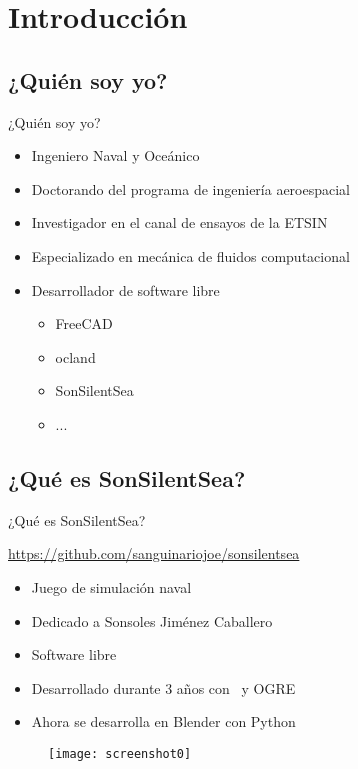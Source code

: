 \section{Introducción} 

\subsection{¿Quién soy yo?}
\begin{frame}{¿Quién soy yo?}
	\begin{itemize}
		\item Ingeniero Naval y Oceánico
		\item Doctorando del programa de ingeniería aeroespacial
		\item Investigador en el canal de ensayos de la ETSIN
		\item Especializado en mecánica de fluidos computacional
		\item Desarrollador de software libre
		\begin{itemize}
			\item FreeCAD
			\item ocland
			\item SonSilentSea
			\item ...
		\end{itemize}	
	\end{itemize}
\end{frame}

\subsection{¿Qué es SonSilentSea?}
\begin{frame}{¿Qué es SonSilentSea?}
	\begin{center}
	\href{https://github.com/sanguinariojoe/sonsilentsea}{https://github.com/sanguinariojoe/sonsilentsea}
	\end{center}
	\begin{itemize}
		\item Juego de simulación naval
		\item Dedicado a Sonsoles Jiménez Caballero
		\item Software libre
		\item Desarrollado durante 3 años con \CC $\,$ y OGRE
		\item Ahora se desarrolla en Blender con Python
	\end{itemize}
	\begin{figure}
		\texttt{[image: screenshot0]} 
	\end{figure}
\end{frame}

